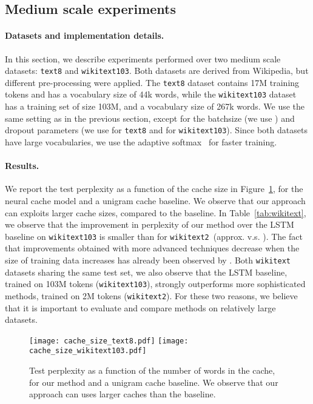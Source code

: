 \documentclass{article} \usepackage{iclr2017_conference,times}
\begin{document}
\subsection{Medium scale experiments}
\paragraph{Datasets and implementation details.} In this section, we describe experiments performed over two medium scale datasets: \texttt{text8} and \texttt{wikitext103}.
Both datasets are derived from Wikipedia, but different pre-processing were applied.
The \texttt{text8} dataset contains 17M training tokens and has a vocabulary size of 44k words, while the \texttt{wikitext103} dataset has a training set of size 103M, and a vocabulary size of 267k words.
We use the same setting as in the previous section, except for the batchsize (we use ) and dropout parameters (we use  for \texttt{text8} and  for \texttt{wikitext103}).
Since both datasets have large vocabularies, we use the adaptive softmax~\citep{grave2016efficient} for faster training.

\paragraph{Results.} We report the test perplexity as a function of the cache size in Figure~\ref{fig:cachesize}, for the neural cache model and a unigram cache baseline.
We observe that our approach can exploits larger cache sizes, compared to the baseline.
In Table~\ref{tab:wikitext}, we observe that the improvement in perplexity of our method over the LSTM baseline on \texttt{wikitext103} is smaller than for \texttt{wikitext2}~(approx.  v.s. ).
The fact that improvements obtained with more advanced techniques decrease when the size of training data increases has already been observed by \citet{goodman2001bit}.
Both \texttt{wikitext} datasets sharing the same test set,  we also observe that the LSTM baseline, trained on 103M tokens (\texttt{wikitext103}), strongly outperforms more sophisticated methods, trained on 2M tokens (\texttt{wikitext2}).
For these two reasons, we believe that it is important to evaluate and compare methods on relatively large datasets.

\begin{figure}
  \centering
  \texttt{[image: cache\_size\_text8.pdf]}
  \hfill
  \texttt{[image: cache\_size\_wikitext103.pdf]}

  \vspace{-0.3cm}
  \caption{Test perplexity as a function of the number of words in the cache, for our method and a unigram cache baseline.
    We observe that our approach can uses larger caches than the baseline.}
  \label{fig:cachesize}
\end{figure}
\end{document}
